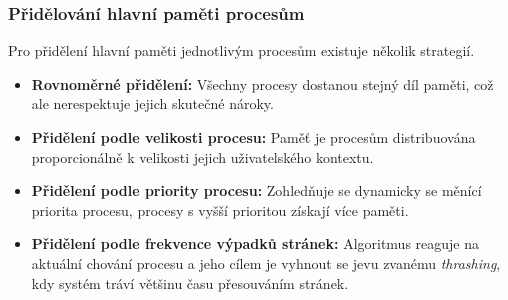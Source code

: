     \subsubsection{Přidělování hlavní paměti procesům}
        Pro přidělení hlavní paměti jednotlivým procesům existuje několik strategií.
        \begin{itemize}
            \item \textbf{Rovnoměrné přidělení:} Všechny procesy dostanou stejný díl paměti, což ale nerespektuje jejich skutečné nároky.
            \item \textbf{Přidělení podle velikosti procesu:} Paměť je procesům distribuována proporcionálně k velikosti jejich uživatelského kontextu.
            \item \textbf{Přidělení podle priority procesu:} Zohledňuje se dynamicky se měnící priorita procesu, procesy s vyšší prioritou získají více paměti.
            \item \textbf{Přidělení podle frekvence výpadků stránek:} Algoritmus reaguje na aktuální chování procesu a jeho cílem je vyhnout se jevu zvanému \textit{thrashing}, kdy systém tráví většinu času přesouváním stránek.
        \end{itemize}